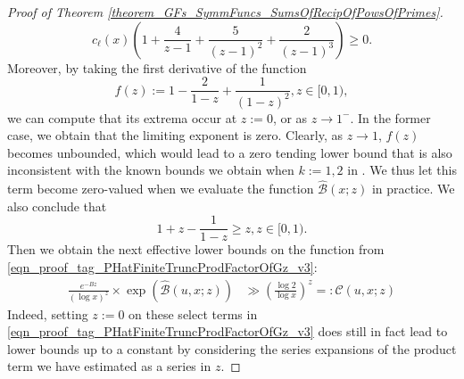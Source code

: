 \documentclass[11pt,reqno,a4letter]{article}
\numberwithin{figure}{section}
\numberwithin{table}{section}
\theoremstyle{plain}
\numberwithin{theorem}{section}
\theoremstyle{definition}
\begin{document}
\begin{proof}[Proof of Theorem \ref{theorem_GFs_SymmFuncs_SumsOfRecipOfPowsOfPrimes}]
\[
c_{\ell}(x) \left( 
     1 + \frac{4}{z-1} + \frac{5}{(z-1)^2} + \frac{2}{(z-1)^3}\right) \geq 0. 
\]
Moreover, by taking the first derivative of the function 
\[
f(z) := 1 - \frac{2}{1-z} + \frac{1}{(1-z)^2}, z \in [0, 1), 
\]
we can compute that its extrema occur at $z := 0$, or as $z \rightarrow 1^{-}$. 
In the former case, we obtain that the limiting exponent is zero. 
Clearly, as $z \rightarrow 1$, $f(z)$ becomes unbounded, which would lead to 
a zero tending lower bound that is also inconsistent with the known bounds we 
obtain when $k := 1, 2$ in \cite[\S 7.4,\ p. 228]{MV}. 
We thus let this term become 
zero-valued when we evaluate the function $\widehat{\mathcal{B}}(x; z)$ in practice. 
We also conclude that 
\[
1 + z - \frac{1}{1-z} \geq z, z \in [0, 1). 
\]
Then we obtain the next effective lower bounds on the function from 
\eqref{eqn_proof_tag_PHatFiniteTruncProdFactorOfGz_v3}:  
\begin{align} 
\label{eqn_proof_tag_simpl_v1} 
\frac{e^{-Bz}}{(\log x)^{z}} \times \exp\left(\widehat{\mathcal{B}}(u, x; z)\right) & \gg 
     \left(\frac{\log 2}{\log x}\right)^{z} =: \widehat{\mathcal{C}}(u, x; z) 
\end{align} 
Indeed, setting $z := 0$ on these select terms in 
\eqref{eqn_proof_tag_PHatFiniteTruncProdFactorOfGz_v3} does still in fact lead to lower bounds 
up to a constant by considering the series expansions of the product term we have estimated as a 
series in $z$. 


\end{proof}
\end{document}
